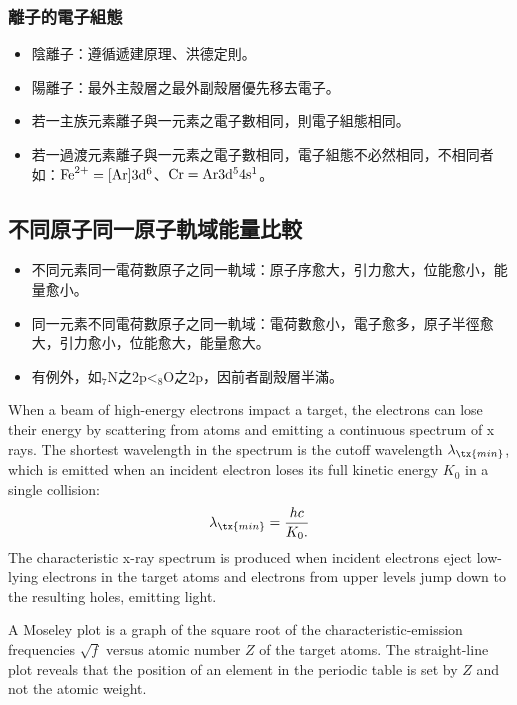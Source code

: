 \documentclass[a4paper,12pt]{report}
\begin{document}
\subsubsection{離子的電子組態}
\begin{itemize}
\item 陰離子：遵循遞建原理、洪德定則。
\item 陽離子：最外主殼層之最外副殼層優先移去電子。 
\item 若一主族元素離子與一元素之電子數相同，則電子組態相同。 
\item 若一過渡元素離子與一元素之電子數相同，電子組態不必然相同，不相同者如：$\rm{Fe}^{2+}=[\rm{Ar}]3d^6$、$\rm{Cr}=\rm{Ar}3d^54s^1$。
\end{itemize}
\subsection{不同原子同一原子軌域能量比較}
\begin{itemize}
\item 不同元素同一電荷數原子之同一軌域：原子序愈大，引力愈大，位能愈小，能量愈小。
\item 同一元素不同電荷數原子之同一軌域：電荷數愈小，電子愈多，原子半徑愈大，引力愈小，位能愈大，能量愈大。
\item 有例外，如$_7$N之2p<$_8$O之2p，因前者副殼層半滿。
\end{itemize}
When a beam of high-energy electrons impact a target, the electrons can lose their energy by scattering from atoms and emitting a continuous spectrum of x rays. The shortest wavelength in the spectrum is the cutoff wavelength $\lambda_{\tx{min}}$, which is emitted when an incident electron loses its full kinetic energy $K_0$ in a single collision:
\[\lambda_{\tx{min}}=\frac{hc}{K_0.}\]
The characteristic x-ray spectrum is produced when incident electrons eject low-lying electrons in the target atoms and electrons from upper levels jump down to the resulting holes, emitting light.

A Moseley plot is a graph of the square root of the characteristic-emission frequencies $\sqrt{f}$ versus atomic number $Z$ of the target atoms. The straight-line plot reveals that the position of an element in the periodic table is set by $Z$ and not the atomic weight.
\end{document}
